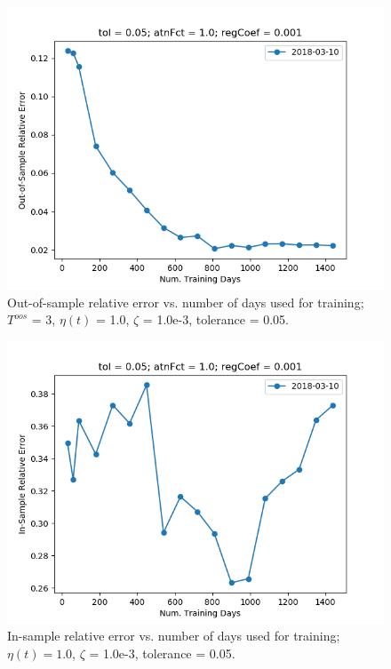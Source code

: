 \documentclass{article}
\begin{document}
\begin{figure}
\includegraphics[scale=0.9,bb=0 0 640 480]{figures/nTrnDays-sensitivity-oos-error.png}
\caption{Out-of-sample relative error vs. number of days used for
  training; $T^{oos}$ = 3, $\eta(t)$ = 1.0, $\zeta$ = 1.0e-3,
  tolerance = 0.05.}
\label{fig:nTrnDays-sensitivity-oos-error}
\end{figure}

\begin{figure}
\includegraphics[scale=0.9,bb=0 0 640 480]{figures/nTrnDays-sensitivity-error.png}
\caption{In-sample relative error vs. number of days used for
  training; $\eta(t) = 1.0$, $\zeta$ = 1.0e-3, tolerance = 0.05.}
\label{fig:nTrnDays-sensitivity-error}
\end{figure}
\end{document}
